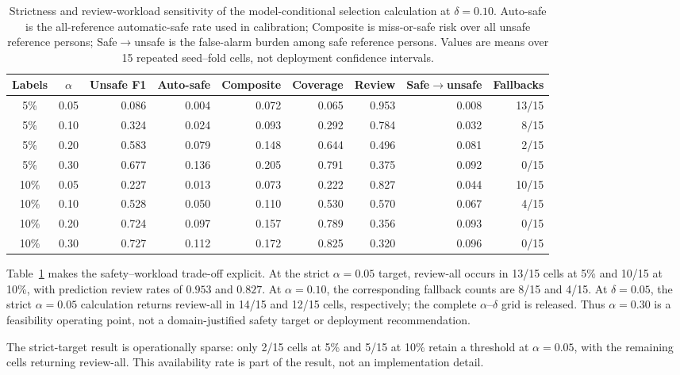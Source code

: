\documentclass[iicol,pdflatex,sn-mathphys-num]{sn-jnl}
\begin{document}
\begin{table}[t]
\caption{Strictness and review-workload sensitivity of the model-conditional selection calculation at $\delta=0.10$. Auto-safe is the all-reference automatic-safe rate used in calibration; Composite is miss-or-safe risk over all unsafe reference persons; Safe$\rightarrow$unsafe is the false-alarm burden among safe reference persons. Values are means over 15 repeated seed--fold cells, not deployment confidence intervals.}
\label{tab:sensitivity}
\centering
\scriptsize
\setlength{\tabcolsep}{3pt}
\begin{tabular}{@{}ccrrrrrrr@{}}
\toprule
Labels & $\alpha$ & Unsafe F1 & Auto-safe & Composite & Coverage & Review & Safe$\rightarrow$unsafe & Fallbacks \\
\midrule
5\% & 0.05 & 0.086 & 0.004 & 0.072 & 0.065 & 0.953 & 0.008 & 13/15 \\
5\% & 0.10 & 0.324 & 0.024 & 0.093 & 0.292 & 0.784 & 0.032 & 8/15 \\
5\% & 0.20 & 0.583 & 0.079 & 0.148 & 0.644 & 0.496 & 0.081 & 2/15 \\
5\% & 0.30 & 0.677 & 0.136 & 0.205 & 0.791 & 0.375 & 0.092 & 0/15 \\
\midrule
10\% & 0.05 & 0.227 & 0.013 & 0.073 & 0.222 & 0.827 & 0.044 & 10/15 \\
10\% & 0.10 & 0.528 & 0.050 & 0.110 & 0.530 & 0.570 & 0.067 & 4/15 \\
10\% & 0.20 & 0.724 & 0.097 & 0.157 & 0.789 & 0.356 & 0.093 & 0/15 \\
10\% & 0.30 & 0.727 & 0.112 & 0.172 & 0.825 & 0.320 & 0.096 & 0/15 \\
\bottomrule
\end{tabular}
\end{table}

Table~\ref{tab:sensitivity} makes the safety--workload trade-off explicit. At the strict $\alpha=0.05$ target, review-all occurs in 13/15 cells at 5\% and 10/15 at 10\%, with prediction review rates of $0.953$ and $0.827$. At $\alpha=0.10$, the corresponding fallback counts are 8/15 and 4/15. At $\delta=0.05$, the strict $\alpha=0.05$ calculation returns review-all in 14/15 and 12/15 cells, respectively; the complete $\alpha$--$\delta$ grid is released. Thus $\alpha=0.30$ is a feasibility operating point, not a domain-justified safety target or deployment recommendation.

The strict-target result is operationally sparse: only 2/15 cells at 5\% and 5/15 at 10\% retain a threshold at $\alpha=0.05$, with the remaining cells returning review-all. This availability rate is part of the result, not an implementation detail.
\end{document}
